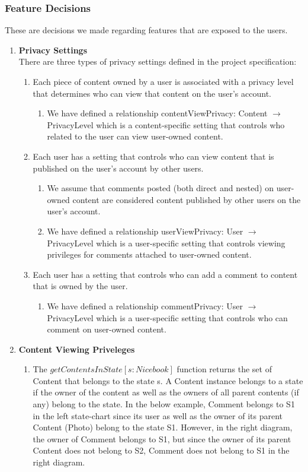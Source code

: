 \documentclass[titlepage]{article}
\begin{document}
\subsubsection{Feature Decisions}
These are decisions we made regarding features that are exposed to the users.
\begin{enumerate}
\item\textbf{Privacy Settings}\\
There are three types of privacy settings defined in the project specification:
\begin{enumerate}
	\item Each piece of content owned by a user is associated with a privacy level that determines who can view that content on the user’s account.
	      \begin{enumerate}
		      \item We have defined a relationship contentViewPrivacy: Content $\rightarrow$ PrivacyLevel which is a content-specific setting that controls who related to the user can view user-owned content.
	      \end{enumerate}
	\item Each user has a setting that controls who can view content that is published on the user’s account by other users.
	      \begin{enumerate}
		      \item We assume that comments posted (both direct and nested) on user-owned content are considered content published by other users on the user’s account.
		      \item We have defined a relationship userViewPrivacy: User $\rightarrow$ PrivacyLevel which is a user-specific setting that controls viewing privileges for comments attached to user-owned content.
	      \end{enumerate}
	\item Each user has a setting that controls who can add a comment to content that is owned by the user.
	      \begin{enumerate}
		      \item We have defined a relationship commentPrivacy: User $\rightarrow$ PrivacyLevel which is a user-specific setting that controls who can comment on user-owned content.
	      \end{enumerate}
\end{enumerate}
\item\textbf{Content Viewing Priveleges}
\begin{enumerate}
	\item The $getContentsInState[s: Nicebook]$ function returns the set of Content that belongs to the state s. A Content instance belongs to a state if the owner of the content as well as the owners of all parent contents (if any) belong to the state. In the below example, Comment belongs to S1 in the left state-chart since its user as well as the owner of its parent Content (Photo) belong to the state S1. However, in the right diagram, the owner of Comment belongs to S1, but since the owner of its parent Content does not belong to S2, Comment does not belong to S1 in the right diagram.


\end{enumerate}
\end{enumerate}
\end{document}
